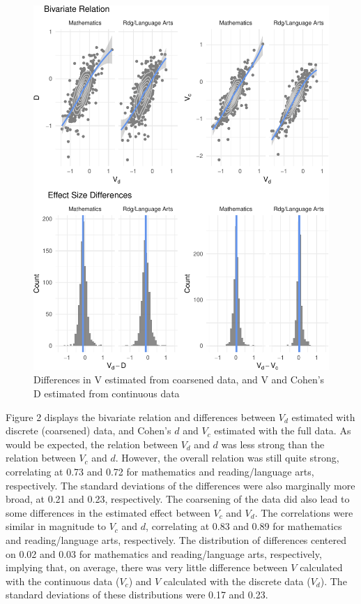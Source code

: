 \documentclass[man, fleqn, noextraspace]{apa6}
\theoremstyle{definition}
\theoremstyle{definition}
\theoremstyle{definition}
\theoremstyle{remark}
\begin{document}
\begin{figure}
\centering
\includegraphics{anderson_ncme18_files/figure-latex/unnamed-chunk-2-1.pdf}
\caption{\label{fig:unnamed-chunk-2}Differences in V estimated from
coarsened data, and V and Cohen's D estimated from continuous data}
\end{figure}

Figure 2 displays the bivariate relation and differences between \(V_d\)
estimated with discrete (coarsened) data, and Cohen's \(d\) and \(V_c\)
estimated with the full data. As would be expected, the relation between
\(V_d\) and \(d\) was less strong than the relation between \(V_c\) and
\(d\). However, the overall relation was still quite strong, correlating
at 0.73 and 0.72 for mathematics and reading/language arts,
respectively. The standard deviations of the differences were also
marginally more broad, at 0.21 and 0.23, respectively. The coarsening of
the data did also lead to some differences in the estimated effect
between \(V_c\) and \(V_d\). The correlations were similar in magnitude
to \(V_c\) and \(d\), correlating at 0.83 and 0.89 for mathematics and
reading/language arts, respectively. The distribution of differences
centered on 0.02 and 0.03 for mathematics and reading/language arts,
respectively, implying that, on average, there was very little
difference between \(V\) calculated with the continuous data (\(V_c\))
and \(V\) calculated with the discrete data (\(V_d\)). The standard
deviations of these distributions were 0.17 and 0.23.
\end{document}

